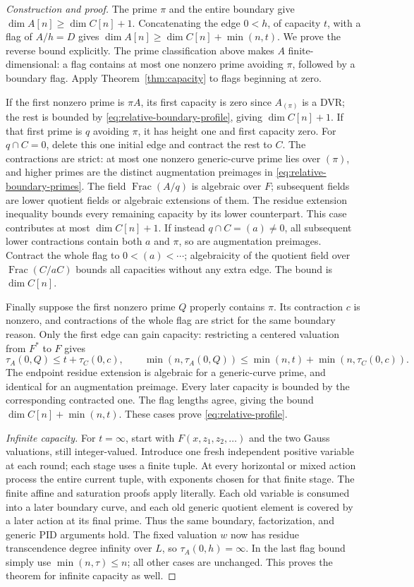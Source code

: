 \documentclass[10pt,a4paper]{amsart}
\begin{document}
\begin{proof}[Construction and proof]
The prime \(\pi\) and the entire boundary give
\(\dim A[n]\ge\dim C[n]+1\).  Concatenating the edge
\(0<h\), of capacity \(t\), with a flag of \(A/h=D\)
gives \(\dim A[n]\ge\dim C[n]+\min(n,t)\).
We prove the reverse bound explicitly.  The prime classification
above makes \(A\) finite-dimensional: a flag contains at most
one nonzero prime avoiding \(\pi\), followed by a boundary
flag.  Apply Theorem~\ref{thm:capacity} to flags beginning at zero.

If the first nonzero prime is \(\pi A\), its first capacity
is zero since \(A_{(\pi)}\) is a DVR; the rest is bounded by
\eqref{eq:relative-boundary-profile}, giving \(\dim C[n]+1\).
If that first prime is \(q\) avoiding \(\pi\), it has height
one and first capacity zero.  For \(q\cap C=0\), delete this
one initial edge and contract the rest to \(C\).  The
contractions are strict: at most one nonzero generic-curve
prime lies over \((\pi)\), and higher primes are the distinct
augmentation preimages in \eqref{eq:relative-boundary-primes}.
The field \(\operatorname{Frac}(A/q)\) is algebraic over
\(F\); subsequent fields are lower quotient fields or
algebraic extensions of them.  The residue extension inequality
bounds every remaining capacity by its lower counterpart.  This
case contributes at most \(\dim C[n]+1\).  If instead
\(q\cap C=(a)\ne0\), all subsequent lower contractions
contain both \(a\) and \(\pi\), so are augmentation preimages.
Contract the whole flag to \(0<(a)<\cdots\); algebraicity of
the quotient field over \(\operatorname{Frac}(C/aC)\) bounds
all capacities without any extra edge.  The bound is \(\dim C[n]\).

Finally suppose the first nonzero prime \(Q\) properly contains
\(\pi\).  Its contraction \(c\) is nonzero, and contractions
of the whole flag are strict for the same boundary reason.
Only the first edge can gain capacity: restricting a centered
valuation from \(F^*\) to \(F\) gives
\[
 \tau_A(0,Q)\le t+\tau_C(0,c),\qquad
 \min(n,\tau_A(0,Q))
 \le\min(n,t)+\min(n,\tau_C(0,c)).
\]
The endpoint residue extension is algebraic for a generic-curve
prime, and identical for an augmentation preimage.  Every later
capacity is bounded by the corresponding contracted one.  The
flag lengths agree, giving the bound \(\dim C[n]+\min(n,t)\).
These cases prove \eqref{eq:relative-profile}.

\smallskip\noindent\emph{Infinite capacity.}
For \(t=\infty\), start with \(F(x,z_1,z_2,\ldots)\) and
the two Gauss valuations, still integer-valued.  Introduce one
fresh independent positive variable at each round; each stage
uses a finite tuple.  At every horizontal or mixed action process
the entire current tuple, with exponents chosen for that finite
stage.  The finite affine and saturation proofs apply literally.
Each old variable is consumed into a later boundary curve, and
each old generic quotient element is covered by a later action
at its final prime.  Thus the same boundary, factorization, and
generic PID arguments hold.  The fixed valuation \(w\) now has
residue transcendence degree infinity over \(L\), so
\(\tau_A(0,h)=\infty\).  In the last flag bound simply use
\(\min(n,\tau)\le n\); all other cases are unchanged.  This
proves the theorem for infinite capacity as well.
\end{proof}
\end{document}

